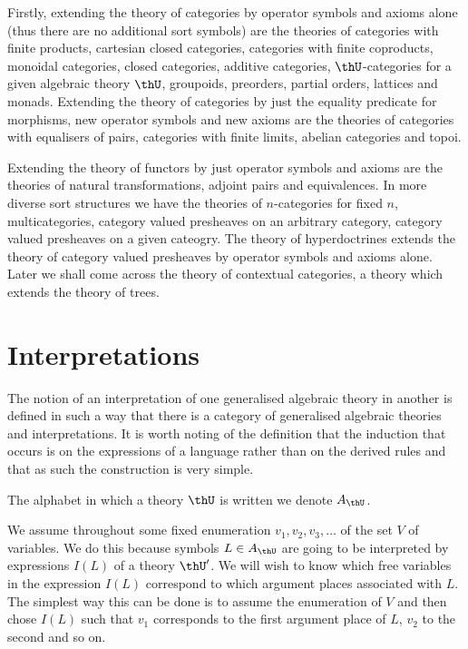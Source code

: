 Firstly, extending the theory of categories by operator symbols and axioms alone (thus there are no additional sort symbols) are the theories of categories with finite products, cartesian closed categories, categories with finite coproducts, monoidal categories, closed categories, additive categories, $\thU$-categories for a given algebraic theory $\thU$, groupoids, preorders, partial orders, lattices and monads.
%
Extending the theory of categories by just the equality predicate for morphisms, new operator symbols and new axioms are the theories of categories with equalisers of pairs, categories with finite limits, abelian categories and topoi.

Extending the theory of functors by just operator symbols and axioms are the theories of natural transformations, adjoint pairs and equivalences.
%
In more diverse sort structures we have the theories of $n$-categories for fixed $n$, multicategories, category valued presheaves on an arbitrary category, category valued presheaves on a given cateogry.
%
The theory of hyperdoctrines extends the theory of category valued presheaves by operator symbols and axioms alone.
%
Later we shall come across the theory of contextual categories, a theory which extends the theory of trees.

\section{Interpretations} \label{sec:source-1-11}

The notion of an interpretation of one generalised algebraic theory in another is defined in such a way that there is a category of generalised algebraic theories and interpretations.
%
It is worth noting of the definition that the induction that occurs is on the expressions of a language rather than on the derived rules and that as such the construction is very simple.

The alphabet in which a theory $\thU$ is written we denote $A_\thU$.

We assume throughout some fixed enumeration $v_1,v_2,v_3,\ldots$ of the set $V$ of variables.
%
We do this because symbols $L\in A_{\thU}$ are going to be interpreted by expressions $I(L)$ of a theory $\thU'$.
%
We will wish to know which free variables in the expression $I(L)$ correspond to which argument places associated with $L$.
%
The simplest way this can be done is to assume the enumeration of $V$ and then chose $I(L)$ such that $v_1$ corresponds to the first argument place of $L$, $v_2$ to the second and so on.

